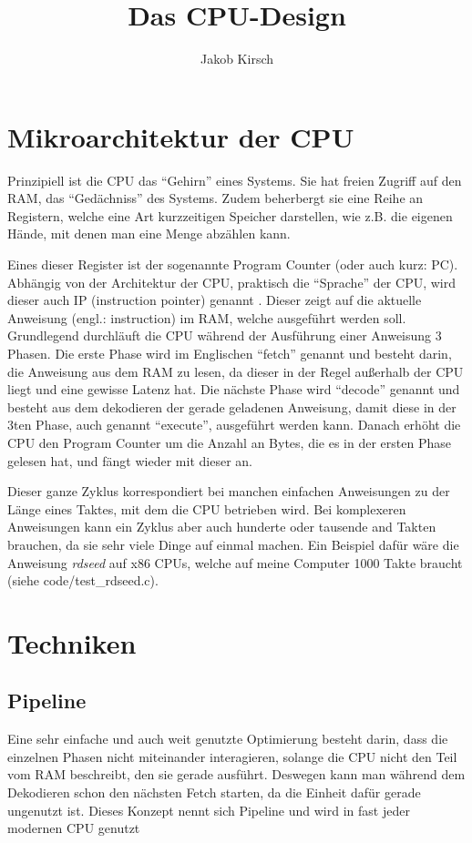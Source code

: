 \documentclass[8pt, letterpaper]{article}
\title{Das CPU-Design}
\author{Jakob Kirsch}
\date{\parbox{\linewidth}{\centering%
  \today\endgraf\bigskip
  Fach: Informationsverarbeitung\endgraf\medskip
  Betreuer: Mathis Maier\endgraf\medskip
}}
\begin{document}
\maketitle
\newpage
\tableofcontents
\newpage

\section{Mikroarchitektur der CPU}

Prinzipiell ist die CPU das ``Gehirn'' eines Systems. Sie hat freien Zugriff auf den RAM, das ``Gedächniss'' des Systems. Zudem beherbergt sie eine Reihe an Registern, welche eine Art kurzzeitigen Speicher darstellen, wie z.B. die eigenen Hände, mit denen man eine Menge abzählen kann.

Eines dieser Register ist der sogenannte Program Counter (oder auch kurz: PC). Abhängig von der Architektur der CPU, praktisch die ``Sprache'' der CPU, wird dieser auch IP (instruction pointer) genannt \cite{x86-rip}. Dieser zeigt auf die aktuelle Anweisung (engl.: instruction) im RAM, welche ausgeführt werden soll.
Grundlegend durchläuft die CPU während der Ausführung einer Anweisung 3 Phasen. Die erste Phase wird im Englischen ``fetch'' genannt und besteht darin, die Anweisung aus dem RAM zu lesen, da dieser in der Regel außerhalb der CPU liegt und eine gewisse Latenz hat. Die nächste Phase wird ``decode'' genannt und besteht aus dem dekodieren der gerade geladenen Anweisung, damit diese in der 3ten Phase, auch genannt ``execute'', ausgeführt werden kann. Danach erhöht die CPU den Program Counter um die Anzahl an Bytes, die es in der ersten Phase gelesen hat, und fängt wieder mit dieser an.

Dieser ganze Zyklus korrespondiert bei manchen einfachen Anweisungen zu der Länge eines Taktes, mit dem die CPU betrieben wird. Bei komplexeren Anweisungen kann ein Zyklus aber auch hunderte oder tausende and Takten brauchen, da sie sehr viele Dinge auf einmal machen. Ein Beispiel dafür wäre die Anweisung \textit{rdseed} auf x86 CPUs, welche auf meine Computer 1000 Takte braucht (siehe code/test\_rdseed.c).

\section{Techniken}

\subsection{Pipeline}\cite{wiki-pipeline}
Eine sehr einfache und auch weit genutzte Optimierung besteht darin, dass die einzelnen Phasen nicht miteinander interagieren, solange die CPU nicht den Teil vom RAM beschreibt, den sie gerade ausführt. Deswegen kann man während dem Dekodieren schon den nächsten Fetch starten, da die Einheit dafür gerade ungenutzt ist. Dieses Konzept nennt sich Pipeline und wird in fast jeder modernen CPU genutzt\cite{i486-pipeline}
\end{document}

